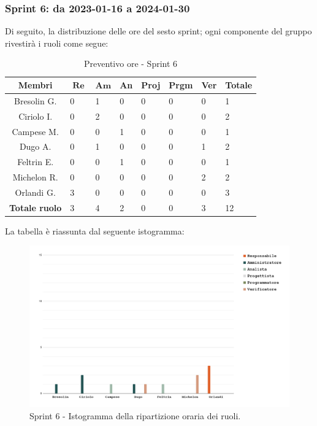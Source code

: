 \documentclass[10pt, a4paper]{article}
\begin{document}
{{{{{{{{{{{{{\subsubsection{Sprint 6: da 2023-01-16 a 2024-01-30}
Di seguito, la distribuzione delle ore del sesto sprint; ogni componente del gruppo rivestirà i ruoli come segue:
\begin{table}[H]
\begin{tabularx}{\textwidth}{c|X|X|X|X|X|X|X}
        \textbf{Membri} & $\operatorname{\textbf{Re}}$ & $\mathrm{\textbf{Am}}$ & \textbf{An} & \textbf{Proj} & \textbf{Prgm} & \textbf{Ver} & \textbf{Totale} \\
        \hline Bresolin G. & 0 & \cellcolor{primarycolor}1 & 0 & 0 & 0 & 0 & 1 \\
        \hline Ciriolo I.  & 0 & \cellcolor{primarycolor}2 & 0 & 0 & 0 & 0 & 2 \\
        \hline Campese M.  & 0 & 0 & \cellcolor{primarycolor}1 & 0 & 0 & 0 & 1 \\
        \hline Dugo A.     & 0 & \cellcolor{primarycolor}1 & 0 & 0 & 0 & 1 & 2 \\
        \hline Feltrin E.  & 0 & 0 & \cellcolor{primarycolor}1 & 0 & 0 & 0 & 1 \\
        \hline Michelon R. & 0 & 0 & 0 & 0 & 0 & \cellcolor{primarycolor}2 & 2 \\
        \hline Orlandi G.  & \cellcolor{primarycolor}3 & 0 & 0 & 0 & 0 & 0 & 3 \\
        \hline
        \textbf{Totale ruolo} & 3 & 4 & 2 & 0 & 0 & 3 & 12
    \end{tabularx}
    \caption{Preventivo ore - Sprint 6}
    \end{table}

La tabella è riassunta dal seguente istogramma:
 \begin{figure}[H]
        \centering        
        \includegraphics[width=15.5cm]{istogrammi/istogramma_6_periodo.png}
        \caption{Sprint 6 - Istogramma della ripartizione oraria dei ruoli. }
    \end{figure}


}}}}}}}}}}}}}
\end{document}

